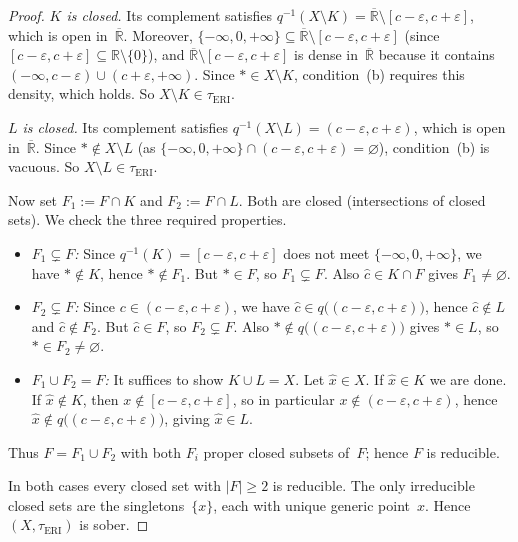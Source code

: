 \documentclass[10pt,a4paper]{amsart}
\begin{document}
\begin{proof}
\emph{$K$ is closed.}\;
Its complement satisfies
$q^{-1}(X \setminus K) = \overline{\mathbb{R}} \setminus
[c-\varepsilon, c+\varepsilon]$, which is open in~$\overline{\mathbb{R}}$.
Moreover, $\{-\infty, 0, +\infty\} \subseteq
\overline{\mathbb{R}} \setminus [c-\varepsilon,c+\varepsilon]$
(since $[c-\varepsilon,c+\varepsilon] \subseteq
\mathbb{R}\setminus\{0\}$), and
$\overline{\mathbb{R}} \setminus [c-\varepsilon,c+\varepsilon]$
is dense in~$\overline{\mathbb{R}}$ because it contains
$(-\infty, c-\varepsilon) \cup (c+\varepsilon, +\infty)$.
Since $\ast \in X \setminus K$, condition~(b) requires this density,
which holds.  So $X \setminus K \in \tau_{\mathrm{ERI}}$.

\emph{$L$ is closed.}\;
Its complement satisfies
$q^{-1}(X \setminus L) = (c-\varepsilon, c+\varepsilon)$, which is open
in~$\overline{\mathbb{R}}$.
Since $\ast \notin X \setminus L$ (as
$\{-\infty, 0, +\infty\} \cap (c-\varepsilon,c+\varepsilon) = \varnothing$),
condition~(b) is vacuous.  So $X \setminus L \in \tau_{\mathrm{ERI}}$.

Now set $F_1 := F \cap K$ and $F_2 := F \cap L$.  Both are closed
(intersections of closed sets).  We check the three required properties.
\begin{itemize}[nosep]
\item \emph{$F_1 \subsetneq F$:}\;
  Since $q^{-1}(K) = [c-\varepsilon,c+\varepsilon]$ does not meet
  $\{-\infty,0,+\infty\}$, we have $\ast \notin K$, hence
  $\ast \notin F_1$.  But $\ast \in F$, so $F_1 \subsetneq F$.
  Also $\hat{c} \in K \cap F$ gives $F_1 \neq \varnothing$.
\item \emph{$F_2 \subsetneq F$:}\;
  Since $c \in (c-\varepsilon,c+\varepsilon)$, we have
  $\hat{c} \in q\bigl((c-\varepsilon,c+\varepsilon)\bigr)$, hence
  $\hat{c} \notin L$ and $\hat{c} \notin F_2$.  But $\hat{c} \in F$,
  so $F_2 \subsetneq F$.
  Also $\ast \notin q\bigl((c-\varepsilon,c+\varepsilon)\bigr)$ gives
  $\ast \in L$, so $\ast \in F_2 \neq \varnothing$.
\item \emph{$F_1 \cup F_2 = F$:}\;
  It suffices to show $K \cup L = X$.  Let $\hat{x} \in X$.  If
  $\hat{x} \in K$ we are done.  If $\hat{x} \notin K$, then
  $x \notin [c-\varepsilon, c+\varepsilon]$, so in particular
  $x \notin (c-\varepsilon, c+\varepsilon)$, hence
  $\hat{x} \notin q\bigl((c-\varepsilon,c+\varepsilon)\bigr)$, giving
  $\hat{x} \in L$.
\end{itemize}
Thus $F = F_1 \cup F_2$ with both $F_i$ proper closed subsets
of~$F$; hence $F$ is reducible.

\medskip
In both cases every closed set with $|F| \geq 2$ is reducible.
The only irreducible closed sets are the singletons~$\{x\}$, each with
unique generic point~$x$.  Hence $(X, \tau_{\mathrm{ERI}})$ is sober.
\end{proof}
\end{document}
